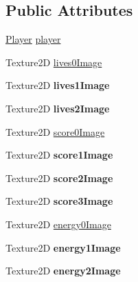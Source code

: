 \subsection*{Public Attributes}
\begin{DoxyCompactItemize}
\item 
\hyperlink{class_player}{Player} \hyperlink{class_game_g_u_i_aaf11d452941e19af9d99589ec3eede07}{player}
\item 
Texture2\-D \hyperlink{class_game_g_u_i_a64ec47396cfa0bda7d7a4d4f992fa348}{lives0\-Image}
\item 
\hypertarget{class_game_g_u_i_a324c00977585c504b93562c4042bf9fe}{Texture2\-D {\bfseries lives1\-Image}}\label{class_game_g_u_i_a324c00977585c504b93562c4042bf9fe}

\item 
\hypertarget{class_game_g_u_i_a104fcc5af724fb89316908292e5a46f8}{Texture2\-D {\bfseries lives2\-Image}}\label{class_game_g_u_i_a104fcc5af724fb89316908292e5a46f8}

\item 
Texture2\-D \hyperlink{class_game_g_u_i_a9b992cd8fe1ed5570fc81cdbb42f0697}{score0\-Image}
\item 
\hypertarget{class_game_g_u_i_a35ea95a9aecbbe5d60859a4147c1e233}{Texture2\-D {\bfseries score1\-Image}}\label{class_game_g_u_i_a35ea95a9aecbbe5d60859a4147c1e233}

\item 
\hypertarget{class_game_g_u_i_ae06a2f91bb435f37bb2f877b60b06c78}{Texture2\-D {\bfseries score2\-Image}}\label{class_game_g_u_i_ae06a2f91bb435f37bb2f877b60b06c78}

\item 
\hypertarget{class_game_g_u_i_a66e1c2c665e15cc0e5553f40a1f1d1d6}{Texture2\-D {\bfseries score3\-Image}}\label{class_game_g_u_i_a66e1c2c665e15cc0e5553f40a1f1d1d6}

\item 
Texture2\-D \hyperlink{class_game_g_u_i_addaaf5e6428ada3c0bca2e7a8f3c137b}{energy0\-Image}
\item 
\hypertarget{class_game_g_u_i_a4649d8f2e869ead2e34a1236f0fe25da}{Texture2\-D {\bfseries energy1\-Image}}\label{class_game_g_u_i_a4649d8f2e869ead2e34a1236f0fe25da}

\item 
\hypertarget{class_game_g_u_i_a44d4ccce21ae22bf0ee75909a311b4df}{Texture2\-D {\bfseries energy2\-Image}}\label{class_game_g_u_i_a44d4ccce21ae22bf0ee75909a311b4df}

\end{DoxyCompactItemize}


